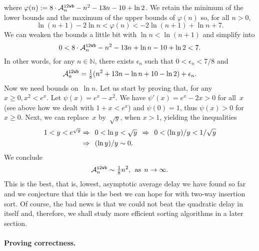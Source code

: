 where \(\varphi(n) := 8 \cdot \ave{i2wb}{n} - n^2 - 13n - 10 + \ln
2\). We retain the minimum of the lower bounds and the maximum of the
upper bounds of \(\varphi(n)\) so, for all \(n>0\),
\begin{equation*}
\ln(n+1) - 2\ln n < \varphi(n) < -2\ln(n+1) + \ln n + 7.
\end{equation*}
We can weaken the bounds a little bit with \(\ln n < \ln(n+1)\) and
simplify into
\begin{equation*}
0 < 8 \cdot \ave{i2wb}{n} - n^2 - 13n + \ln n - 10 + \ln 2 < 7.
\end{equation*}
In other words, for any \(n \in \mathbb{N}\), there exists
\(\epsilon_n\) such that \(0 < \epsilon_n < 7/8\) and
\begin{equation}
\ave{i2wb}{n} = \tfrac{1}{8}(n^2 + 13n - \ln n + 10 - \ln 2) +
\epsilon_n.\label{ineq:i2wb}
\end{equation}
Now we need bounds on~\(\ln n\). Let us start by proving that, for any
\(x\geqslant 0, x^2 < e^x\). Let \(\psi(x) = e^x - x^2\). We have
\(\psi'(x) = e^x - 2x > 0\) for all~\(x\) (see above how we dealt with
\(1 + x < e^x\)) and \(\psi(0) = 1\), thus \(\psi(x)>0\) for
\(x\geqslant{}0\). Next, we can replace~\(x\) by~\(\sqrt{y}\), when
\(x>1\), yielding the inequalities
\begin{align}
1 < y < e^{\sqrt{y}} & \Rightarrow\,\; 0 < \ln y < \sqrt{y}
\;\,\Rightarrow\;\, 0 < (\ln y)/y < 1/\sqrt{\smash[b]{y}}\notag\\
                   & \Rightarrow\;\, (\ln y)/y \mathrel{\sim} 0.
\label{ineq:ln}
\end{align}
We conclude
\[
\ave{i2wb}{n} \mathrel{\sim} \tfrac{1}{8}{n^2},\,\; \text{as} \,\; n
\rightarrow \infty.
\]
This is the best, that is, lowest, asymptotic average delay we have
found so far and we conjecture that this is the best we can hope for
with two\hyp{}way insertion sort. Of course, the bad news is that we
could not beat the quadratic delay in itself and, therefore, we shall
study more efficient sorting algorithms in a later section.

\medskip

\paragraph{Proving correctness.}
\label{par:insertion_correctness}

